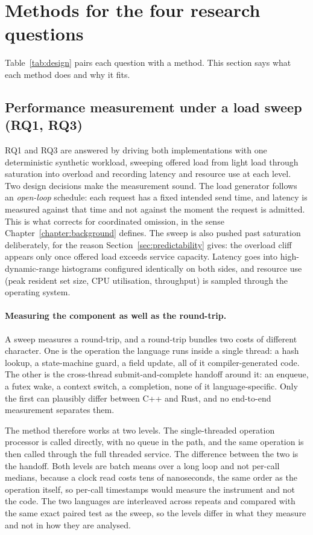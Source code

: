 \documentclass[english,twoside,openright,a4paper,censored,csm,software-track-2020]{HYthesisML}
\begin{document}
\section{Methods for the four research questions}
Table~\ref{tab:design} pairs each question with a method. This section says what each method
does and why it fits.

\subsection{Performance measurement under a load sweep (RQ1, RQ3)}\label{sec:methodperf}
RQ1 and RQ3 are answered by driving both implementations with one deterministic synthetic
workload, sweeping offered load from light load through saturation into overload and recording
latency and resource use at each level. Two design decisions make the measurement sound. The
load generator follows an \emph{open-loop} schedule: each request has a fixed intended send
time, and latency is measured against that time and not against the moment the request is
admitted. This is what corrects for coordinated omission, in the sense
Chapter~\ref{chapter:background} defines. The sweep is also pushed past saturation deliberately,
for the reason Section~\ref{sec:predictability} gives: the overload cliff appears only once
offered load exceeds service capacity. Latency goes into high-dynamic-range histograms
configured identically on both sides, and resource use (peak resident set size, CPU utilisation,
throughput) is sampled through the operating system.

\paragraph{Measuring the component as well as the round-trip.}
A sweep measures a round-trip, and a round-trip bundles two costs of different character. One is
the operation the language runs inside a single thread: a hash lookup, a state-machine guard, a
field update, all of it compiler-generated code. The other is the cross-thread
submit-and-complete handoff around it: an enqueue, a futex wake, a context switch, a completion,
none of it language-specific. Only the first can plausibly differ between C++ and Rust, and no
end-to-end measurement separates them.

The method therefore works at two levels. The single-threaded operation processor is called
directly, with no queue in the path, and the same operation is then called through the full
threaded service. The difference between the two is the handoff. Both levels are batch means
over a long loop and not per-call medians, because a clock read costs tens of nanoseconds, the
same order as the operation itself, so per-call timestamps would measure the instrument and not
the code.
The two languages are interleaved across repeats and compared with the same exact paired test as
the sweep, so the levels differ in what they measure and not in how they are analysed.
\end{document}
